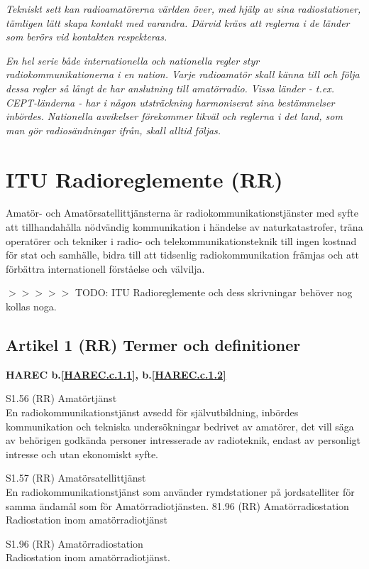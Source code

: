 \emph{Tekniskt sett kan radioamatörerna världen över, med hjälp av
  sina radiostationer, tämligen lätt skapa kontakt med
  varandra. Därvid krävs att reglerna i de länder som berörs vid
  kontakten respekteras.}

\emph{En hel serie både internationella och nationella regler styr
  radiokommunikationerna i en nation. Varje radioamatör skall känna
  till och följa dessa regler så långt de har anslutning till
  amatörradio. Vissa länder - t.ex. CEPT-länderna - har i någon
  utsträckning harmoniserat sina bestämmelser inbördes.  Nationella
  avvikelser förekommer likväl och reglerna i det land, som man gör
  radiosändningar ifrån, skall alltid följas.}

\section{ITU Radioreglemente (RR)}

Amatör- och Amatörsatellittjänsterna är radiokommunikationstjänster
med syfte att tillhandahålla nödvändig kommunikation i händelse av
naturkatastrofer, träna operatörer och tekniker i radio- och
telekommunikationsteknik till ingen kostnad för stat och samhälle,
bidra till att tidsenlig radiokommunikation främjas och att förbättra
internationell förståelse och välvilja.

$>>>>>$ TODO: ITU Radioreglemente och dess skrivningar behöver nog kollas noga.

\subsection{Artikel 1 (RR) Termer och definitioner}
\textbf{
HAREC b.\ref{HAREC.c.1.1}\label{myHAREC.c.1.1},
 b.\ref{HAREC.c.1.2}\label{myHAREC.c.1.2}
}

S1.56 (RR) Amatörtjänst \\
En radiokommunikationstjänst avsedd för självutbildning, inbördes
kommunikation och tekniska undersökningar bedrivet av amatörer, det
vill säga av behörigen godkända personer intresserade av radioteknik,
endast av personligt intresse och utan ekonomiskt syfte.

S1.57 (RR) Amatörsatellittjänst \\
En radiokommunikationstjänst som använder rymdstationer på
jordsatelliter för samma ändamål som för Amatörradiotjänsten.  81.96
(RR) Amatörradiostation Radiostation inom amatörradiotjänst

S1.96 (RR) Amatörradiostation \\
Radiostation inom amatörradiotjänst.

